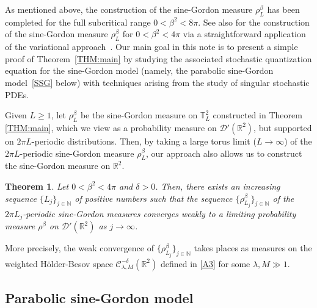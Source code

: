 \documentclass[letterpaper, 11pt,  reqno]{amsart}
\newtheorem{theorem}{Theorem} [section]
\theoremstyle{myremark}
\newcommand{\1}{\hspace{0.5mm}\text{I}\hspace{0.5mm}}
\newcommand{\R}{\mathbb{R}}
\newcommand{\T}{\mathbb{T}}
\newcommand{\CC}{\mathcal{C}}
\newcommand{\be}{\beta}
\newcommand{\dl}{\delta}
\newcommand{\ld}{\lambda}
\newcommand{\N}{\mathbb{N}}
\numberwithin{equation}{section}
\numberwithin{theorem}{section}
\begin{document}
 
 As mentioned above, the construction of the sine-Gordon measure $\rho_L^\be$
 has been completed for the full subcritical range $0 < \be^2 < 8\pi$.
 See also \cite[Theorem 1.1]{ORSW} for the construction
 of the sine-Gordon measure $\rho_L^\be$
 for $0 < \be^2 < 4\pi$
 via a straightforward application of the variational approach~\cite{BG}. 
 Our main goal in this note
 is to present 
a simple proof of Theorem~\ref{THM:main} 
by studying  the  associated stochastic quantization 
equation 
for the sine-Gordon model
(namely, the parabolic sine-Gordon model~\eqref{SSG} below)
with 
techniques 
arising  from the study of singular stochastic PDEs. 




Given $L \ge 1$, let $\rho^\be_L$ be  the sine-Gordon measure  on $\T^2_L$ constructed in Theorem \ref{THM:main}, which we view as a probability measure on  $\mathcal D'(\R^2)$, 
but supported on 
$2\pi L$-periodic distributions.
Then, by taking a large torus limit ($L \to \infty$) of the $2\pi L$-periodic sine-Gordon
measure $\rho^\be_L$, 
our approach also allows us to construct 
the sine-Gordon measure on $\R^2$.


 \begin{theorem}\label{THM:main2}
Let $0 < \be^2 < 4\pi$ and $\dl > 0$. 
 Then, 
 there exists an increasing  sequence $\{L_j\}_{j \in \N}$
 of positive numbers such that 
the sequence  $\{\rho_{L_j}^\be\}_{j \in \N}$ 
of the $2\pi L_j$-periodic sine-Gordon measures
converges weakly to a limiting probability measure 
 $\rho^\be$ on $\mathcal{D}'(\R^2)$
 as $j \to \infty$.
 \end{theorem}



More precisely, 
the weak convergence of  $\{\rho_{L_j}^\be\}_{j \in \N}$  takes places 
as measures on 
the weighted H\"older-Besov space
$\CC^{-\dl}_{\ld, M} (\R^2)$ defined in \eqref{A3}
for some  $\ld, M \gg 1$.



\subsection{Parabolic sine-Gordon model}
\end{document}
